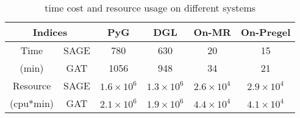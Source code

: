 \documentclass[conference]{IEEEtran}
\begin{document}
\begin{table}%
	\centering
	\caption {time cost and resource usage on different systems}
	\label{tab:efficiency}
		\begin{tabular}{cccccc}
		\toprule
		 \multicolumn{2}{c}{Indices} & PyG &DGL & On-MR & On-Pregel \\ 
		\midrule
		Time & SAGE & 780 &630 & 20 & 15 \\
		\cmidrule(lr){2-2}
		(min)				   & GAT & 1056 &948 & 34 & 21 \\
		\cmidrule(lr){1-6}				   
		Resource  & SAGE & $1.6 \times10^6$ &$1.3 \times 10^6$& $2.6 \times 10^4$ &$2.9 \times 10^4$  \\
		\cmidrule(lr){2-2}
		(cpu*min)				   & GAT &$2.1 \times 10^6$ &$1.9 \times 10^6$ &$4.4 \times 10^4$ &$4.1 \times 10^4$ \\
		\bottomrule
	\end{tabular}
\end{table}

\end{document}
